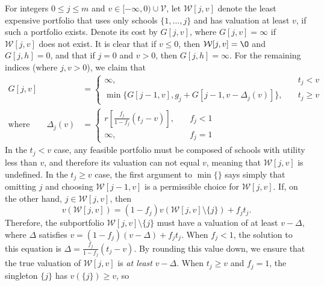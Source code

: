 \documentclass[11pt]{article} %
\theoremstyle{definition}
\theoremstyle{definition}
\begin{document}
For integers $0 \leq j \leq m$ and $v \in [-\infty, 0) \cup \mathcal{V}$, let $\mathcal{W}[j, v]$ denote the least expensive portfolio that uses only schools $\{ 1, \dots, j\}$ and has valuation at least $v$, if such a portfolio exists. Denote its cost by $G[j, v]$, where $G[j, v] = \infty$ if $\mathcal{W}[j, v]$ does not exist. It is clear that if $v \leq 0$, then $\mathcal{W}[j, v] = \O$ and $G[j, h] = 0$, and that if $j = 0$ and $v > 0$, then $G[j, h] = \infty$.  For the remaining indices (where $j, v > 0$), we claim that
\begin{align} \label{recursionrelationforcostmindp}
G[j, v] &=
\begin{cases}
\infty, \quad & t_j < v \\
\min\bigl\{G[j-1, v], g_j + G[j-1, v - \Delta_j(v)] \bigr\}, \quad & t_j \geq v 
\end{cases}\\
\text{where}\qquad
\Delta_j (v) &= 
\begin{cases}
r\left[\frac{f_j}{1 - f_j} (t_j - v)\right], \quad & f_j < 1\\
\infty, &f_j = 1
\end{cases} \label{deltajvdef}
\end{align}
In the $t_j < v$ case, any feasible portfolio must be composed of schools with utility less than $v$, and therefore its valuation can not equal $v$, meaning that $\mathcal{W}[j, v]$ is undefined. In the $t_j \geq v$ case, the first argument to $\min\{\}$ says simply that omitting $j$ and choosing $\mathcal{W}[j-1, v]$ is a permissible choice for $\mathcal{W}[j, v]$. If, on the other hand, $j \in \mathcal{W}[j, v]$, then
\begin{equation} \label{solvemeforvwjvminusj}
v(\mathcal{W}[j, v]) = (1 - f_j )v(\mathcal{W}[j, v]\setminus \{j\}) + f_j t_j.\end{equation}
Therefore, the subportfolio $\mathcal{W}[j, v]\setminus \{j\}$ must have a valuation of at least $v - \Delta$, where $\Delta$ satisfies $v = (1 - f_j )(v - \Delta) + f_j t_j $. When $f_j < 1$, the solution to this equation is $ \Delta = \frac{f_j}{1 - f_j} (t_j - v)$. By rounding this value down, we ensure that the true valuation of $\mathcal{W}[j, v]$ is \emph{at least} $v - \Delta$. When $t_j \geq v$ and $f_j = 1$, the singleton $\{j\}$ has $v(\{j\}) \geq v$, so
\end{document}
